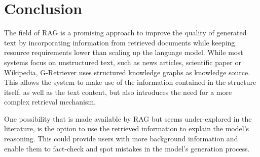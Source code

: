 \section{Conclusion}

The field of RAG is a promising approach to improve the quality of generated text by incorporating information from retrieved documents while keeping resource requirements lower than scaling up the language model.
While most systems focus on unstructured text, such as news articles, scientific paper or Wikipedia, G-Retriever uses structured knowledge graphs as knowledge source.
This allows the system to make use of the information contained in the structure itself, as well as the text content, but also introduces the need for a more complex retrieval mechanism.

One possibility that is made available by RAG but seems under-explored in the literature, is the option to use the retrieved information to explain the model's reasoning.
This could provide users with more background information and enable them to fact-check and spot mistakes in the model's generation process.

